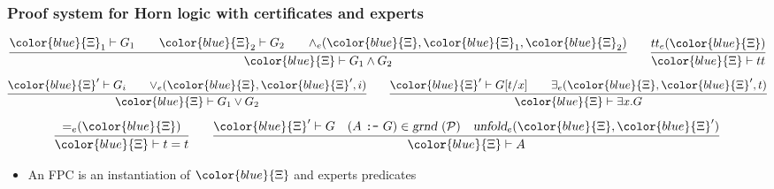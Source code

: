 \documentclass{beamer}
\newcommand{\red}[1]{{\color{red} #1}}
\newcommand{\trueExpert }[1]{{\true_e}(#1)}
\newcommand{\eqExpert }[1]{{=_e}(#1)}
\newcommand{\unfoldExpert}[2]{{\hbox{\sl unfold}_e}(#1,#2)}
\newcommand{\andExpert}[3]{{\wedge_e}(#1,#2,#3)}
\newcommand{\orExpert  }[3]{{\vee_e}(#1,#2,#3)}
\newcommand{\someExpert}[3]{\exists_e(#1,#2,#3)}
\newcommand{\true}{tt}
\newcommand{\XXi}{{\color{blue}{\Xi}}}
\begin{document}
\newcommand{\instan}[1]{\hbox{\sl grnd}~(#1)}
\newcommand{\Pscr}{{\mathcal P}}
%
\begin{frame}
  \frametitle{Proof system for Horn logic with certificates and experts}

\[
\infer{\XXi\vdash G_1\wedge G_2}
      {\XXi_1\vdash G_1\qquad \XXi_2\vdash G_2\qquad \andExpert{\XXi}{\XXi_1}{\XXi_2}}
\qquad
\infer{\XXi\vdash \true}
      {\trueExpert{\XXi}}
\]
\vskip -6pt
\[
\infer{\XXi\vdash G_1\vee G_2}
      {\XXi'\vdash G_i\qquad \orExpert{\XXi}{\XXi'}{i}}
\qquad
\infer{\XXi\vdash \exists x. G}
      {\XXi'\vdash G[t/x]\qquad \someExpert{\XXi}{\XXi'}{t}}
\]
\vskip -6pt
\[
\infer{\XXi\vdash t = t}
      {\eqExpert{\XXi}}
\qquad
\infer{\XXi\vdash A}
      {\XXi'\vdash G \quad (A~\hbox{\tt :-}~G)\in\instan\Pscr
                     \quad \unfoldExpert{\XXi}{\XXi'}}
\]
\pause
\begin{itemize}
\item An FPC is an instantiation of $\XXi$ and experts predicates
\end{itemize}
\end{frame}
\end{document}
